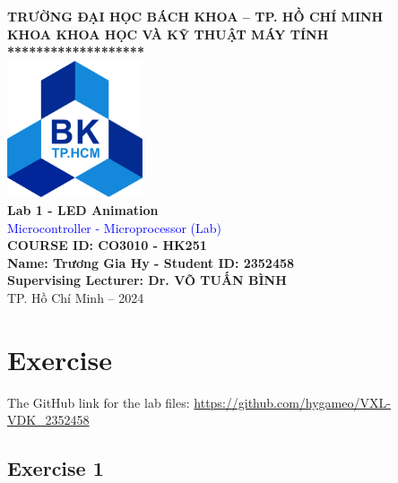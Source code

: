 \documentclass[a4paper,12pt]{article}
\begin{document}

\begin{mdframed}[style=MyFrame]
\thispagestyle{empty}
\begin{center}
    \vspace*{0.5cm}
    {\large \textbf{TRƯỜNG ĐẠI HỌC BÁCH KHOA – TP. HỒ CHÍ MINH}}\\[0.2cm]
    {\large \textbf{KHOA KHOA HỌC VÀ KỸ THUẬT MÁY TÍNH}}\\[0.5cm]
    \textbf{*******************}\\[1cm]

    \includegraphics[width=0.3\textwidth]{bk_logo.png}\\[2cm]

    {\LARGE \textbf{Lab 1 - LED Animation}}\\[0.5cm]
    {\LARGE \textcolor{blue}{Microcontroller - Microprocessor (Lab)}}\\[0.5cm]
    {\LARGE \textbf{COURSE ID: CO3010 - HK251}}\\[0.5cm]
    \textbf{\large Name: Trương Gia Hy   -   Student ID: 2352458}\\[0.5cm]
    \textbf{\large Supervising Lecturer: Dr. VÕ TUẤN BÌNH}\\[8.5cm]

    {\large TP. Hồ Chí Minh – 2024}
\end{center}
\end{mdframed}

\newpage
\section{Exercise}
The GitHub link for the lab files:
\textcolor{blue}{\url{https://github.com/hygameo/VXL-VDK_2352458}}
\subsection{Exercise 1}
\end{document}
